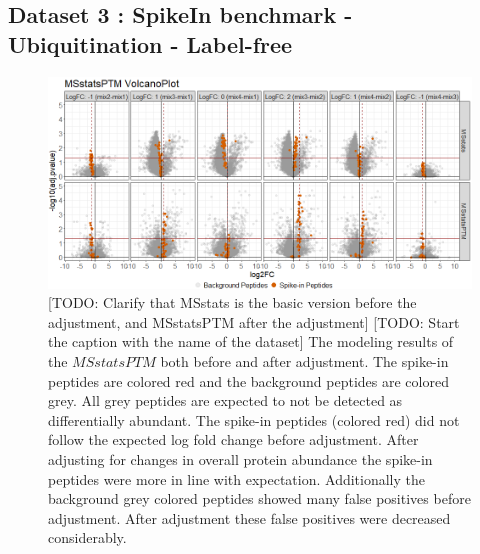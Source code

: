 \documentclass{mcp}
\def\todo#1{{\color{red}[TODO: #1]}}
\begin{document}
\clearpage
\subsection{Dataset 3 : SpikeIn benchmark - Ubiquitination - Label-free}
\label{sec:benchmark}

\begin{figure}[h!]
\centering
\includegraphics[width=1\textwidth]{sim_new/spike_in_msstatsptm_volcano}
\caption{\todo{Clarify that MSstats is the basic version before the adjustment, and MSstatsPTM after the adjustment} \todo{Start the caption with the name of the dataset} The modeling results of the $MSstatsPTM$ both before and after adjustment. The spike-in peptides are colored red and the background peptides are colored grey. All grey peptides are expected to not be detected as differentially abundant. The spike-in peptides (colored red) did not follow the expected log fold change before adjustment. After adjusting for changes in overall protein abundance the spike-in peptides were more in line with expectation. Additionally the background grey colored peptides showed many false positives before adjustment. After adjustment these false positives were decreased considerably. \label{fig:spike_volcano_msstats}}
\end{figure}
\end{document}
